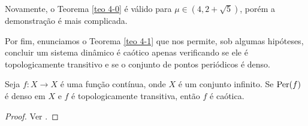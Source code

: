 Novamente, o Teorema \ref{teo 4-0} é válido para $\mu \in (4, 2 + \sqrt{5})$, porém a demonstração é mais complicada.

Por fim, enunciamos o Teorema \ref{teo 4-1} que nos permite, sob algumas hipóteses, concluir um sistema dinâmico é caótico apenas verificando se ele é topologicamente transitivo e se o conjunto de pontos periódicos é denso.

\begin{theorem}\label{teo 4-1}
Seja $f: X \to X$ é uma função contínua, onde $X$ é um conjunto infinito. Se $\operatorname{Per}(f)$ é denso em $X$ e $f$ é topologicamente transitiva, então $f$ é caótica.
\end{theorem}

\begin{proof}
Ver \cite{holmgren}.
\end{proof}
